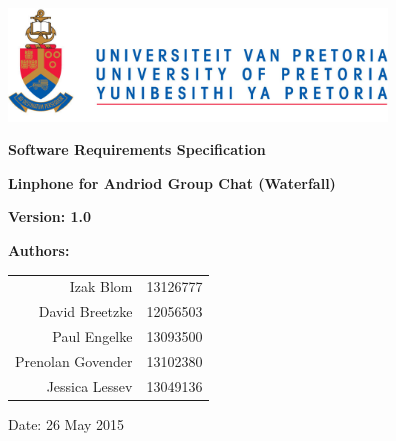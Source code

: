 \begin{titlepage}
\begin{flushright}

\includegraphics[width=380px]{./images/University_of_Pretoria_Logo.png}
\newline
\newline

\textbf {\LARGE Software Requirements Specification} \newline

\textbf {\Large Linphone for Andriod Group Chat (Waterfall)}\newline

\textbf {\large Version: 1.0}\newline

\centering \textbf {\large Authors:}

\begin{table}[H]
\large
\centering
\begin{tabular}{rl}
	Izak Blom & 13126777 \\
	David Breetzke & 12056503 \\
	Paul Engelke & 13093500 \\
	Prenolan Govender & 13102380 \\
	Jessica Lessev & 13049136 \\
\end{tabular}
\end{table}

Date: 26 May 2015

\end{flushright}
\end{titlepage}